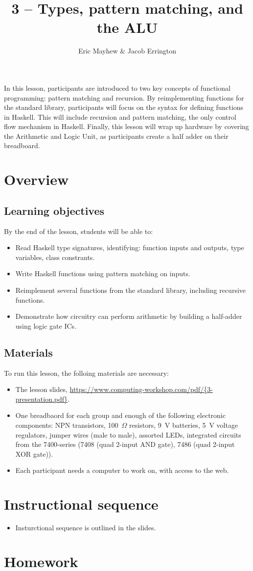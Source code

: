 \documentclass[11pt]{article}
\title{3 -- Types, pattern matching, and the ALU}
\author{Eric Mayhew \& Jacob Errington}
\date{}
\newcommand{\cwurl}{https://www.computing-workshop.com/}
\newcommand{\cwpdf}{\cwurl pdf/}
\begin{document}
\maketitle

In this lesson, participants are introduced to two key concepts of functional
programming: pattern matching and recursion. By reimplementing functions for the
standard library, participants will focus on the
syntax for defining functions in Haskell. This will include recursion and
pattern matching, the only control flow mechanism in Haskell. Finally, this
lesson will wrap up hardware by covering the Arithmetic and Logic Unit, as
participants create a half adder on their breadboard.

\section*{Overview}

\subsection*{Learning objectives}

By the end of the lesson, students will be able to:
%
\begin{itemize}
\item Read Haskell type signatures, identifying: function inputs and outputs,
  type variables, class constrants.
\item Write Haskell functions using pattern matching on inputs.
\item Reimplement several functions from the standard library, including
  recursive functions.
\item Demonstrate how circuitry can perform arithmetic by building a half-adder
  using logic gate ICs.
\end{itemize}

\subsection*{Materials}

To run this lesson, the folloing materials are necessary:

\begin{itemize}
\item The lesson slides, \url{\cwpdf{3-presentation.pdf}}.
\item One breadbaord for each group and enough of the following electronic
  components:
  NPN transistors,
  100~$\Omega$ resistors,
  9~V batteries,
  5~V voltage regulators,
  jumper wires (male to male),
  assorted LEDs,
  integrated circuits from the 7400-series (7408 (quad 2-input AND gate), 7486
  (quad 2-input XOR gate)).
\item Each participant needs a computer to work on, with access to the web.
\end{itemize}

\section*{Instructional sequence}

\begin{itemize}
\item
Insturctional sequence is outlined in the slides.
\end{itemize}

\section*{Homework}
\end{document}

